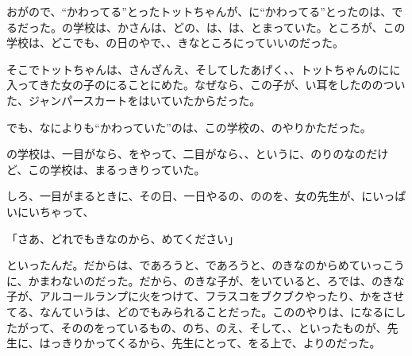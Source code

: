 おがので、“かわってる”とったトットちゃんが、に“かわってる”とったのは、でるだった。の学校は、かさんは、どの、は、は、とまっていた。ところが、この学校は、どこでも、の日のやで、、きなところにっていいのだった。

そこでトットちゃんは、さんざんえ、そしてしたあげく、、トットちゃんのにに入ってきた女の子のにることにめた。なぜなら、この子が、い耳をしたののついた、ジャンパースカートをはいていたからだった。

でも、なによりも“かわっていた”のは、この学校の、のやりかただった。

の学校は、一目がなら、をやって、二目がなら、、というに、のりのなのだけど、この学校は、まるっきりっていた。

しろ、一目がまるときに、その日、一日やるの、ののを、女の先生が、にいっぱいにいちゃって、

「さあ、どれでもきなのから、めてください」

といったんだ。だからは、であろうと、であろうと、のきなのからめていっこうに、かまわないのだった。だから、のきな子が、をいていると、ろでは、のきな子が、アルコールランプに火をつけて、フラスコをブクブクやったり、かをさせてる、なんていうは、どのでもみられることだった。こののやりは、になるにしたがって、そののをっているもの、のち、のえ、そして、、といったものが、先生に、はっきりかってくるから、先生にとって、をる上で、よりのだった。

